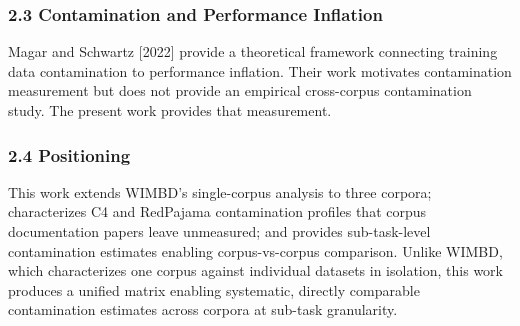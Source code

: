 \subsubsection{2.3 Contamination and Performance Inflation}

Magar and Schwartz [2022] provide a theoretical framework connecting training data contamination to performance inflation. Their work motivates contamination measurement but does not provide an empirical cross-corpus contamination study. The present work provides that measurement.

\subsubsection{2.4 Positioning}

This work extends WIMBD's single-corpus analysis to three corpora; characterizes C4 and RedPajama contamination profiles that corpus documentation papers leave unmeasured; and provides sub-task-level contamination estimates enabling corpus-vs-corpus comparison. Unlike WIMBD, which characterizes one corpus against individual datasets in isolation, this work produces a unified matrix enabling systematic, directly comparable contamination estimates across corpora at sub-task granularity.

